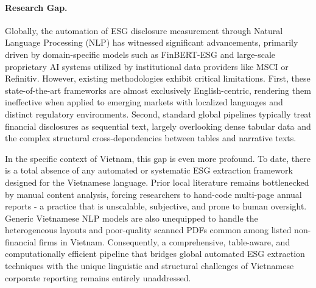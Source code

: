 \documentclass{article}
\theoremstyle{plain}
\theoremstyle{definition}
\theoremstyle{remark}
\begin{document}
\paragraph{Research Gap.}
Globally, the automation of ESG disclosure measurement through Natural Language Processing (NLP) has witnessed significant advancements, primarily driven by domain-specific models such as FinBERT-ESG and large-scale proprietary AI systems utilized by institutional data providers like MSCI or Refinitiv. However, existing methodologies exhibit critical limitations. First, these state-of-the-art frameworks are almost exclusively English-centric, rendering them ineffective when applied to emerging markets with localized languages and distinct regulatory environments. Second, standard global pipelines typically treat financial disclosures as sequential text, largely overlooking dense tabular data and the complex structural cross-dependencies between tables and narrative texts. 

In the specific context of Vietnam, this gap is even more profound. To date, there is a total absence of any automated or systematic ESG extraction framework designed for the Vietnamese language. Prior local literature remains bottlenecked by manual content analysis, forcing researchers to hand-code multi-page annual reports - a practice that is unscalable, subjective, and prone to human oversight. Generic Vietnamese NLP models are also unequipped to handle the heterogeneous layouts and poor-quality scanned PDFs common among listed non-financial firms in Vietnam. Consequently, a comprehensive, table-aware, and computationally efficient pipeline that bridges global automated ESG extraction techniques with the unique linguistic and structural challenges of Vietnamese corporate reporting remains entirely unaddressed.
\end{document}
